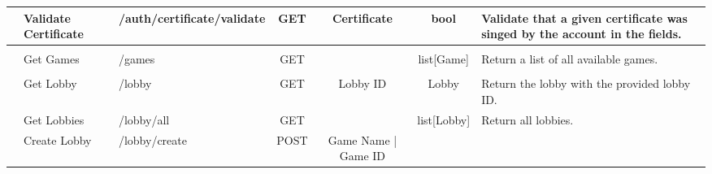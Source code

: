 \begin{table}[H]
{\begin{tabular}{|cllcccl|}
    \rowcolor[HTML]{FFF8DD} 
    \multicolumn{1}{|c|}{\cellcolor[HTML]{F8696B}} &
      \multicolumn{1}{l|}{\cellcolor[HTML]{FFF8DD}Validate Certificate} &
      \multicolumn{1}{l|}{\cellcolor[HTML]{FFF8DD}/auth/certificate/validate} &
      \multicolumn{1}{c|}{\cellcolor[HTML]{FFF8DD}GET} &
      \multicolumn{1}{c|}{\cellcolor[HTML]{FFF8DD}Certificate} &
      \multicolumn{1}{c|}{\cellcolor[HTML]{FFF8DD}bool} &
      Validate   that a given certificate was singed by the account in the fields. \\ \hline
    \rowcolor[HTML]{DDF0FF} 
    \multicolumn{7}{|c|}{\cellcolor[HTML]{DDF0FF}\textbf{Games}} \\ \hline
    \rowcolor[HTML]{FFF8DD} 
    \multicolumn{1}{|c|}{\cellcolor[HTML]{63BE7B}} &
      \multicolumn{1}{l|}{\cellcolor[HTML]{FFF8DD}Get Games} &
      \multicolumn{1}{l|}{\cellcolor[HTML]{FFF8DD}/games} &
      \multicolumn{1}{c|}{\cellcolor[HTML]{FFF8DD}GET} &
      \multicolumn{1}{c|}{\cellcolor[HTML]{FFF8DD}} &
      \multicolumn{1}{c|}{\cellcolor[HTML]{FFF8DD}list{[}Game{]}} &
      Return   a list of all available games. \\ \hline
    \rowcolor[HTML]{DDF0FF} 
    \multicolumn{7}{|c|}{\cellcolor[HTML]{DDF0FF}\textbf{Lobby}} \\ \hline
    \rowcolor[HTML]{FFF8DD} 
    \multicolumn{1}{|c|}{\cellcolor[HTML]{63BE7B}} &
      \multicolumn{1}{l|}{\cellcolor[HTML]{FFF8DD}Get Lobby} &
      \multicolumn{1}{l|}{\cellcolor[HTML]{FFF8DD}/lobby} &
      \multicolumn{1}{c|}{\cellcolor[HTML]{FFF8DD}GET} &
      \multicolumn{1}{c|}{\cellcolor[HTML]{FFF8DD}Lobby ID} &
      \multicolumn{1}{c|}{\cellcolor[HTML]{FFF8DD}Lobby} &
      Return   the lobby with the provided lobby ID. \\ \hline
    \rowcolor[HTML]{FFDDDD} 
    \multicolumn{1}{|c|}{\cellcolor[HTML]{63BE7B}} &
      \multicolumn{1}{l|}{\cellcolor[HTML]{FFDDDD}Get Lobbies} &
      \multicolumn{1}{l|}{\cellcolor[HTML]{FFDDDD}/lobby/all} &
      \multicolumn{1}{c|}{\cellcolor[HTML]{FFDDDD}GET} &
      \multicolumn{1}{c|}{\cellcolor[HTML]{FFDDDD}} &
      \multicolumn{1}{c|}{\cellcolor[HTML]{FFDDDD}list{[}Lobby{]}} &
      Return   all lobbies. \\ \hline
    \rowcolor[HTML]{FFF8DD} 
    \multicolumn{1}{|c|}{\cellcolor[HTML]{63BE7B}} &
      \multicolumn{1}{l|}{\cellcolor[HTML]{FFF8DD}Create Lobby} &
      \multicolumn{1}{l|}{\cellcolor[HTML]{FFF8DD}/lobby/create} &
      \multicolumn{1}{c|}{\cellcolor[HTML]{FFF8DD}POST} &
      \multicolumn{1}{c|}{\cellcolor[HTML]{FFF8DD}Game Name | Game ID} &

\end{tabular}}
\end{table}
